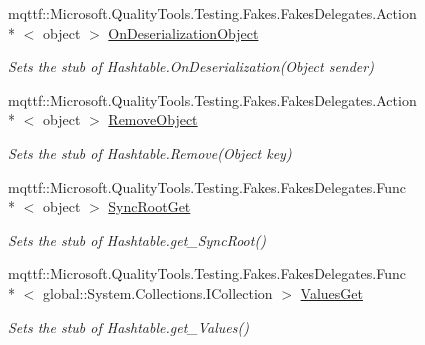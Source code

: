 \begin{DoxyCompactItemize}
mqttf\-::\-Microsoft.\-Quality\-Tools.\-Testing.\-Fakes.\-Fakes\-Delegates.\-Action\\*
$<$ object $>$ \hyperlink{class_system_1_1_configuration_1_1_fakes_1_1_stub_settings_context_a4d21958f197b9984bf3c1178f2a24ab9}{On\-Deserialization\-Object}
\begin{DoxyCompactList}\small\item\em Sets the stub of Hashtable.\-On\-Deserialization(\-Object sender)\end{DoxyCompactList}\item 
mqttf\-::\-Microsoft.\-Quality\-Tools.\-Testing.\-Fakes.\-Fakes\-Delegates.\-Action\\*
$<$ object $>$ \hyperlink{class_system_1_1_configuration_1_1_fakes_1_1_stub_settings_context_ae40aaf979e3cf8a901292b9fc264ec45}{Remove\-Object}
\begin{DoxyCompactList}\small\item\em Sets the stub of Hashtable.\-Remove(\-Object key)\end{DoxyCompactList}\item 
mqttf\-::\-Microsoft.\-Quality\-Tools.\-Testing.\-Fakes.\-Fakes\-Delegates.\-Func\\*
$<$ object $>$ \hyperlink{class_system_1_1_configuration_1_1_fakes_1_1_stub_settings_context_a0a2eea09b6468848b46210790962b274}{Sync\-Root\-Get}
\begin{DoxyCompactList}\small\item\em Sets the stub of Hashtable.\-get\-\_\-\-Sync\-Root()\end{DoxyCompactList}\item 
mqttf\-::\-Microsoft.\-Quality\-Tools.\-Testing.\-Fakes.\-Fakes\-Delegates.\-Func\\*
$<$ global\-::\-System.\-Collections.\-I\-Collection $>$ \hyperlink{class_system_1_1_configuration_1_1_fakes_1_1_stub_settings_context_ae9aa542f7b5c0ee5cd1a540b312da130}{Values\-Get}
\begin{DoxyCompactList}\small\item\em Sets the stub of Hashtable.\-get\-\_\-\-Values()\end{DoxyCompactList}\end{DoxyCompactItemize}
